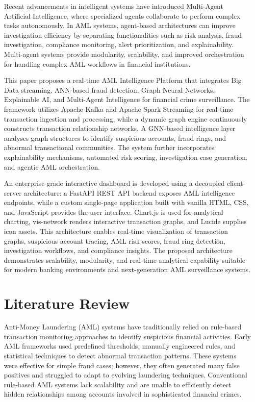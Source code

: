 \documentclass[conference]{IEEEtran}
\begin{document}
Recent advancements in intelligent systems have introduced Multi-Agent Artificial Intelligence, where specialized agents collaborate to perform complex tasks autonomously. In AML systems, agent-based architectures can improve investigation efficiency by separating functionalities such as risk analysis, fraud investigation, compliance monitoring, alert prioritization, and explainability. Multi-agent systems provide modularity, scalability, and improved orchestration for handling complex AML workflows in financial institutions.

This paper proposes a real-time AML Intelligence Platform that integrates Big Data streaming, ANN-based fraud detection, Graph Neural Networks, Explainable AI, and Multi-Agent Intelligence for financial crime surveillance. The framework utilizes Apache Kafka and Apache Spark Streaming for real-time transaction ingestion and processing, while a dynamic graph engine continuously constructs transaction relationship networks. A GNN-based intelligence layer analyses graph structures to identify suspicious accounts, fraud rings, and abnormal transactional communities. The system further incorporates explainability mechanisms, automated risk scoring, investigation case generation, and agentic AML orchestration.

An enterprise-grade interactive dashboard is developed using a decoupled client-server architecture: a FastAPI REST API backend exposes AML intelligence endpoints, while a custom single-page application built with vanilla HTML, CSS, and JavaScript provides the user interface. Chart.js is used for analytical charting, vis-network renders interactive transaction graphs, and Lucide supplies icon assets. This architecture enables real-time visualization of transaction graphs, suspicious account tracing, AML risk scores, fraud ring detection, investigation workflows, and compliance insights. The proposed architecture demonstrates scalability, modularity, and real-time analytical capability suitable for modern banking environments and next-generation AML surveillance systems.

\section{Literature Review}

Anti-Money Laundering (AML) systems have traditionally relied on rule-based transaction monitoring approaches to identify suspicious financial activities. Early AML frameworks used predefined thresholds, manually engineered rules, and statistical techniques to detect abnormal transaction patterns. These systems were effective for simple fraud cases; however, they often generated many false positives and struggled to adapt to evolving laundering techniques. Conventional rule-based AML systems lack scalability and are unable to efficiently detect hidden relationships among accounts involved in sophisticated financial crimes.
\end{document}
